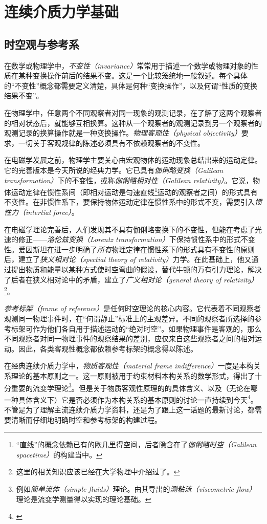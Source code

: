 \documentclass[zihao=-4,linespread=1.5,a4paper,heading=true,twoside]{ctexbook}
\theoremstyle{definition}
\theoremstyle{plain}
\begin{document}
\part{连续介质力学基础}\label{sec:III}
\chapter{时空观与参考系}\label{sec:III.5}
在数学或物理学中，\emph{不变性（invariance）}常常用于描述一个数学或物理对象的性质在某种变换操作前后的结果不变。这是一个比较笼统地一般叙述。每个具体的“不变性”概念都需要定义清楚，具体是何种“变换操作”，以及何谓“性质的变换结果不变”。

在物理学中，任意两个不同观察者对同一现象的观测记录，在了解了这两个观察者的相对状态后，就能够互相换算。这种从一个观察者的观测记录到另一个观察者的观测记录的换算操作就是一种变换操作。\emph{物理客观性（physical objectivity）}要求，一切关于客观规律的陈述必须具有不依赖观察者的不变性。

在电磁学发展之前，物理学主要关心由宏观物体的运动现象总结出来的运动定律。它的完善版本是今天所说的经典力学。它已具有\emph{伽俐略变换（Galilean transformation）}下的不变性，或称\emph{伽俐略相对性（Galilean relativity）}。它说，物体运动定律在惯性系间（即相对运动是匀速直线\footnote{“直线”的概念依赖已有的欧几里得空间，后者隐含在了\emph{伽俐略时空（Galilean spacetime）}的构建当中\cite{Weatherall2022}。}运动的观察者之间）的形式具有不变性。在非惯性系下，要保持物体运动定律在惯性系中的形式不变，需要引入\emph{惯性力（intertial force）}。

在电磁学理论完善后，人们发现其不具有伽俐略变换下的不变性，但能在考虑了光速的修正——\emph{洛伦兹变换（Lorentz transformation）}下保持惯性系中的形式不变性。爱因斯坦在进一步明确了\emph{所有}物理定律在惯性系下的形式具有不变性的原则后，建立了\emph{狭义相对论（spectial theory of relativity）}力学。在此基础上，他又通过提出物质和能量以某种方式使时空弯曲的假设，替代牛顿的万有引力理论，解决了后者在狭义相对论中的矛盾，建立了\emph{广义相对论（general theory of  relativity）}\footnote{这里的相关知识应该已经在大学物理中介绍过了\cite[\S 1,\S 2.5]{邓文基2009大物上}\cite[\S 24]{邓文基2009大物下}。}。

\emph{参考标架（frame of reference）}是任何时空理论的核心内容。它代表着不同观察者观测同一物理事件时，在“何谓静止”标准上的主观差异。不同的观察者所选择的参考标架可作为他们各自用于描述运动的“绝对时空”。如果物理事件是客观的，那么不同观察者对同一物理事件的观察结果的差别，应仅来自这些观察者之间的相对运动。因此，各类客观性概念都依赖参考标架的概念得以陈述。

在经典连续介质力学中，\emph{物质客观性（material frame indifference）}一度是本构关系理论的基本原则之一\cite[Sect.293]{Truesdell1960}\cite[Sect.19]{Truesdell2004}。这一原则被用于约束材料本构关系的数学形式，得出了十分重要的流变学理论\footnote{例如\emph{简单流体（simple fluids）}理论\cite{Noll1958}。由其导出的\emph{测粘流（viscometric flow）}理论是流变学测量得以实现的理论基础\cite{Coleman1966}\cite{Walters1975}。}。但是关于物质客观性原理的的具体含义、以及（无论在哪一种具体含义下）它是否必须作为本构关系的基本原则的讨论一直持续到今天\footnote{\cite{Gennes1983}\cite{Frewer2009}}。不管是为了理解主流连续介质力学资料，还是为了跟上这一话题的最新讨论，都需要清晰而仔细地明确时空和参考标架的构建过程。
\end{document}
